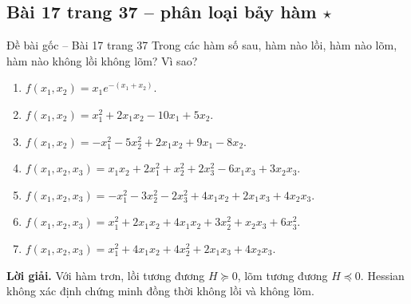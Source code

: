 \documentclass[11pt,a4paper]{article}
\begin{document}
\subsection{Bài 17 trang 37 -- phân loại bảy hàm \(\star\)}
\begin{questionbox}{Đề bài gốc -- Bài 17 trang 37}
Trong các hàm số sau, hàm nào lồi, hàm nào lõm, hàm nào không lồi không lõm? Vì sao?
\begin{enumerate}[label=\roman*),nosep,leftmargin=*]
\item \(f(x_1,x_2)=x_1e^{-(x_1+x_2)}\).
\item \(f(x_1,x_2)=x_1^2+2x_1x_2-10x_1+5x_2\).
\item \(f(x_1,x_2)=-x_1^2-5x_2^2+2x_1x_2+9x_1-8x_2\).
\item \(f(x_1,x_2,x_3)=x_1x_2+2x_1^2+x_2^2+2x_3^2-6x_1x_3+3x_2x_3\).
\item \(f(x_1,x_2,x_3)=-x_1^2-3x_2^2-2x_3^2+4x_1x_2+2x_1x_3+4x_2x_3\).
\item \(f(x_1,x_2,x_3)=x_1^2+2x_1x_2+4x_1x_2+3x_2^2+x_2x_3+6x_3^2\).
\item \(f(x_1,x_2,x_3)=x_1^2+4x_1x_2+4x_2^2+2x_1x_3+4x_2x_3\).
\end{enumerate}
\end{questionbox}
\textbf{Lời giải.} Với hàm trơn, lồi tương đương \(H\succeq0\), lõm tương đương \(H\preceq0\). Hessian không xác định chứng minh đồng thời không lồi và không lõm.
\end{document}
